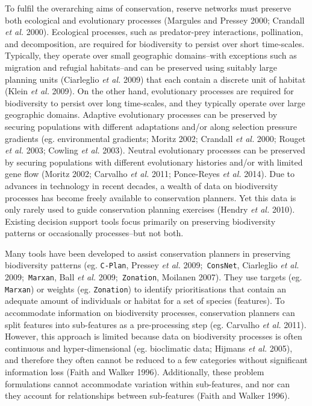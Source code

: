 \documentclass[11pt,]{article}
\begin{document}
To fulfil the overarching aims of conservation, reserve networks must
preserve both ecological and evolutionary processes (Margules and
Pressey 2000; Crandall \emph{et al.} 2000). Ecological processes, such
as predator-prey interactions, pollination, and decomposition, are
required for biodiversity to persist over short time-scales. Typically,
they operate over small geographic domains--with exceptions such as
migration and refugial habitats--and can be preserved using suitably
large planning units (Ciarleglio \emph{et al.} 2009) that each contain a
discrete unit of habitat (Klein \emph{et al.} 2009). On the other hand,
evolutionary processes are required for biodiversity to persist over
long time-scales, and they typically operate over large geographic
domains. Adaptive evolutionary processes can be preserved by securing
populations with different adaptations and/or along selection pressure
gradients (eg. environmental gradients; Moritz 2002; Crandall \emph{et
al.} 2000; Rouget \emph{et al.} 2003; Cowling \emph{et al.} 2003).
Neutral evolutionary processes can be preserved by securing populations
with different evolutionary histories and/or with limited gene flow
(Moritz 2002; Carvalho \emph{et al.} 2011; Ponce-Reyes \emph{et al.}
2014). Due to advances in technology in recent decades, a wealth of data
on biodiversity processes has become freely available to conservation
planners. Yet this data is only rarely used to guide conservation
planning exercises (Hendry \emph{et al.} 2010). Existing decision
support tools focus primarily on preserving biodiversity patterns or
occasionally processes--but not both.

Many tools have been developed to assist conservation planners in
preserving biodiversity patterns (eg. \texttt{C-Plan}, Pressey \emph{et
al.} 2009;\texttt{ ConsNet}, Ciarleglio \emph{et al.}
2009;\texttt{ Marxan}, Ball \emph{et al.} 2009;\texttt{ Zonation},
Moilanen 2007). They use targets (eg. \texttt{Marxan}) or weights (eg.
\texttt{Zonation}) to identify prioritisations that contain an adequate
amount of individuals or habitat for a set of species (features). To
accommodate information on biodiversity processes, conservation planners
can split features into sub-features as a pre-processing step (eg.
Carvalho \emph{et al.} 2011). However, this approach is limited because
data on biodiversity processes is often continuous and hyper-dimensional
(eg. bioclimatic data; Hijmans \emph{et al.} 2005), and therefore they
often cannot be reduced to a few categories without significant
information loss (Faith and Walker 1996). Additionally, these problem
formulations cannot accommodate variation within sub-features, and nor
can they account for relationships between sub-features (Faith and
Walker 1996).
\end{document}
